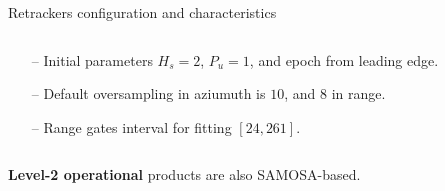 \documentclass[compress,8pt]{beamer}
\begin{document}
\begin{frame}{Retrackers configuration and characteristics}
\begin{columns}
\begin{column}{0.5\textwidth}
\begin{itemize}
    \item[--] Initial parameters $H_s=2$, $P_u=1$, and epoch from leading edge.
    
    \item[--] Default oversampling in aziumuth is $10$, and $8$ in range.

    \item[--] Range gates interval for fitting $[24, 261]$. %
  
 \end{itemize}


\end{column}
\end{columns}
 
 \bigskip
{\bf Level-2 operational} products are also SAMOSA-based.
 
\end{frame}
\end{document}
